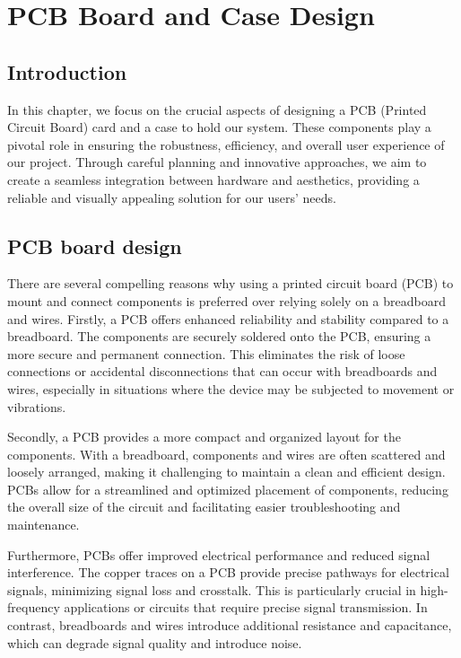 %
%


\chapter{PCB Board and Case Design}
\section{Introduction}
In this chapter, we focus on the crucial aspects of designing a PCB (Printed Circuit Board) card and a case to hold our system. These components play a pivotal role in ensuring the robustness, efficiency, and overall user experience of our project. Through careful planning and innovative approaches, we aim to create a seamless integration between hardware and aesthetics, providing a reliable and visually appealing solution for our users' needs.
\section{ PCB board  design}
There are several compelling reasons why using a printed circuit board (PCB) to mount and connect components is preferred over relying solely on a breadboard and wires. Firstly, a PCB offers enhanced reliability and stability compared to a breadboard. The components are securely soldered onto the PCB, ensuring a more secure and permanent connection. This eliminates the risk of loose connections or accidental disconnections that can occur with breadboards and wires, especially in situations where the device may be subjected to movement or vibrations.

Secondly, a PCB provides a more compact and organized layout for the components. With a breadboard, components and wires are often scattered and loosely arranged, making it challenging to maintain a clean and efficient design. PCBs allow for a streamlined and optimized placement of components, reducing the overall size of the circuit and facilitating easier troubleshooting and maintenance.

Furthermore, PCBs offer improved electrical performance and reduced signal interference. The copper traces on a PCB provide precise pathways for electrical signals, minimizing signal loss and crosstalk. This is particularly crucial in high-frequency applications or circuits that require precise signal transmission. In contrast, breadboards and wires introduce additional resistance and capacitance, which can degrade signal quality and introduce noise.

